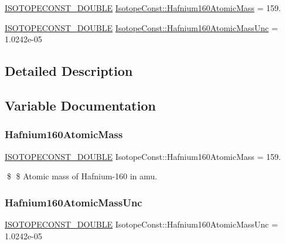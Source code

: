 \begin{DoxyCompactItemize}
\item 
\mbox{\hyperlink{group___isotope_const-_macros_ga8f45a7272ce02c0b4c65c44636ed719a}{I\+S\+O\+T\+O\+P\+E\+C\+O\+N\+S\+T\+\_\+\+D\+O\+U\+B\+LE}} \mbox{\hyperlink{group___isotope_const-_hafnium-_hf160_ga8b6eb66e2bdb1a342496878dcf02ad15}{Isotope\+Const\+::\+Hafnium160\+Atomic\+Mass}} = 159.
\item 
\mbox{\hyperlink{group___isotope_const-_macros_ga8f45a7272ce02c0b4c65c44636ed719a}{I\+S\+O\+T\+O\+P\+E\+C\+O\+N\+S\+T\+\_\+\+D\+O\+U\+B\+LE}} \mbox{\hyperlink{group___isotope_const-_hafnium-_hf160_ga974b7131152564bf781f866a21f1577d}{Isotope\+Const\+::\+Hafnium160\+Atomic\+Mass\+Unc}} = 1.\+0242e-\/05
\end{DoxyCompactItemize}


\subsection{Detailed Description}


\subsection{Variable Documentation}
\mbox{\label{group___isotope_const-_hafnium-_hf160_ga8b6eb66e2bdb1a342496878dcf02ad15}} 
\subsubsection{\texorpdfstring{Hafnium160\+Atomic\+Mass}{Hafnium160AtomicMass}}
{\footnotesize\ttfamily \mbox{\hyperlink{group___isotope_const-_macros_ga8f45a7272ce02c0b4c65c44636ed719a}{I\+S\+O\+T\+O\+P\+E\+C\+O\+N\+S\+T\+\_\+\+D\+O\+U\+B\+LE}} Isotope\+Const\+::\+Hafnium160\+Atomic\+Mass = 159.}

\$ \$ Atomic mass of Hafnium-\/160 in amu. \mbox{\label{group___isotope_const-_hafnium-_hf160_ga974b7131152564bf781f866a21f1577d}} 
\subsubsection{\texorpdfstring{Hafnium160\+Atomic\+Mass\+Unc}{Hafnium160AtomicMassUnc}}
{\footnotesize\ttfamily \mbox{\hyperlink{group___isotope_const-_macros_ga8f45a7272ce02c0b4c65c44636ed719a}{I\+S\+O\+T\+O\+P\+E\+C\+O\+N\+S\+T\+\_\+\+D\+O\+U\+B\+LE}} Isotope\+Const\+::\+Hafnium160\+Atomic\+Mass\+Unc = 1.\+0242e-\/05}

